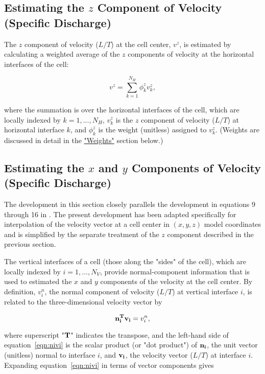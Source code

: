 \subsection{Estimating the $z$ Component of Velocity (Specific Discharge)}

The $z$ component of velocity ($L/T$) at the cell center, $v^z$, is estimated by calculating a weighted average of the $z$ components of velocity at the horizontal interfaces of the cell:

\begin{equation}
\label{eqn:vz}
v^z = \sum_{k=1}^{N_H} \phi_k^z v_k^z,
\end{equation}

\noindent where the summation is over the horizontal interfaces of the cell, which are locally indexed by $k = 1, ..., N_H$, $v_k^z$ is the $z$ component of velocity ($L/T$) at horizontal interface $k$, and $\phi_k^z$ is the weight (unitless) assigned to $v_k^z$. (Weights are discussed in detail in the \hyperref[sec:weights]{"Weights"} section below.)

\subsection{Estimating the $x$ and $y$ Components of Velocity (Specific Discharge)}

The development in this section closely parallels the development in equations 9 through 16 in \cite{modflow6xt3d}. The present development has been adapted specifically for interpolation of the velocity vector at a cell center in $\left( x, y, z \right)$ model coordinates and is simplified by the separate treatment of the $z$ component described in the previous section.

The vertical interfaces of a cell (those along the "sides" of the cell), which are locally indexed by $i = 1, ..., N_V$, provide normal-component information that is used to estimated the $x$ and $y$ components of the velocity at the cell center. By definition, $v_i^n$, the normal component of velocity ($L/T$) at vertical interface $i$, is related to the three-dimensional velocity vector by

\begin{equation}
\label{eqn:nivi}
\mathbf{n_i^T} \mathbf{v_i} = v_i^n,
\end{equation}

\noindent where superscript "$\mathbf{T}$" indicates the transpose, and the left-hand side of equation~\ref{eqn:nivi} is the scalar product (or "dot product") of $\mathbf{n_i}$, the unit vector (unitless) normal to interface $i$, and $\mathbf{v_i}$, the velocity vector ($L/T$) at interface $i$. Expanding equation~\ref{eqn:nivi} in terms of vector components gives

